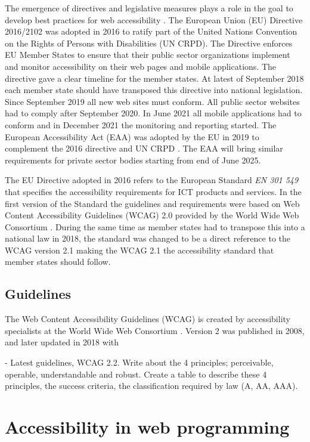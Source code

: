 The emergence of directives and legislative measures plays a role in the goal to develop best practices for web accessibility \citep{eudirective2016}. The European Union (EU) Directive 2016/2102 was adopted in 2016 to ratify part of the United Nations Convention on the Rights of Persons with Disabilities (UN CRPD). The Directive enforces EU Member States to ensure that their public sector organizations implement and monitor accessibility on their web pages and mobile applications. The directive gave a clear timeline for the member states. At latest of September 2018 each member state should have transposed this directive into national legislation. Since September 2019 all new web sites must conform. All public sector websites had to comply after September 2020. In June 2021 all mobile applications had to conform and in December 2021 the monitoring and reporting started. The European Accessibility Act (EAA) was adopted by the EU in 2019 to complement the 2016 directive and UN CRPD \citep{eudirective2019}. The EAA will bring similar requirements for private sector bodies starting from end of June 2025.

The EU Directive adopted in 2016 refers to the European Standard \textit{EN 301 549} that specifies the accessibility requirements for ICT products and services. In the first version of the Standard the guidelines and requirements were based on Web Content Accessibility Guidelines (WCAG) 2.0 provided by the World Wide Web Consortium \citep{wcagadoptioneurope}. During the same time as member states had to transpose this into a national law in 2018, the standard was changed to be a direct reference to the WCAG version 2.1 making the WCAG 2.1 the accessibility standard that member states should follow. 


\subsection{Guidelines}

The Web Content Accessibility Guidelines (WCAG) is created by accessibility specialists at the World Wide Web Consortium \citep{wcagstandard}. Version 2 was published in 2008, and later updated in 2018 with

- Latest guidelines, WCAG 2.2. Write about the 4 principles; perceivable, operable, understandable and robust. Create a table to describe these 4 principles, the success criteria, the classification required by law (A, AA, AAA).


\section{Accessibility in web programming}

